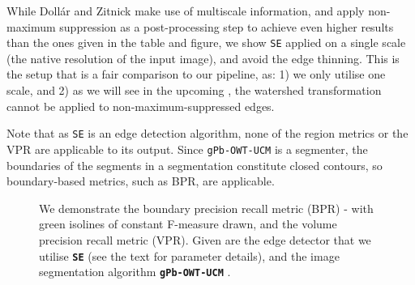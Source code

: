 While Doll{\'a}r and Zitnick \cite{DollarICCV13edges} make use of multiscale information, and apply non-maximum suppression as a post-processing step to achieve even higher results %
than the ones given in the table and figure,
we show {\tt SE} applied on a single scale (the native resolution of the input image), and avoid the edge thinning. This is the setup that is a fair comparison to our pipeline, as: 1) we only utilise one scale, and 2) as we will see in the upcoming , 
the watershed transformation cannot be applied to non-maximum-suppressed edges.

Note that as {\tt SE} is an edge detection algorithm, none of the region metrics or the VPR are applicable to its output. Since {\tt gPb-OWT-UCM} is a segmenter, the boundaries of the segments in a segmentation constitute closed contours, so boundary-based metrics, such as BPR, are applicable.

\begin{figure}[ht!]
\centering
\caption[{\tt SE} and {\tt gPb-OWT-UCM} comparison - plots]{We demonstrate the boundary precision recall metric (BPR) - with %
green isolines of constant F-measure drawn, and the volume precision recall metric (VPR). Given are the edge detector that we utilise \textbf{\texttt{SE}} \cite{DollarICCV13edges} (see the text for parameter details), and the image segmentation algorithm \textbf{\texttt{gPb-OWT-UCM}} \cite{Arbelaez11}.}
\label{fig:SE_vs_gPb_OWT_UCM}
\end{figure}


